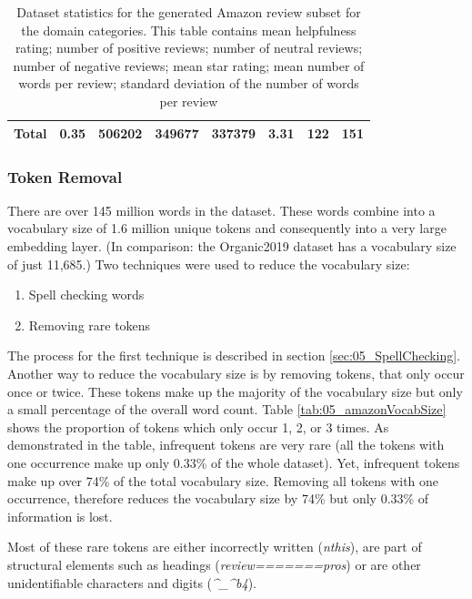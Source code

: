 \begin{table}
\begin{tabularx}{\textwidth}{lXrrrcrr}
		\midrule
		Total						&	0.35 & 	   506202 &	349677& 337379&    3.31 &	 122 &  151 \\
		\bottomrule
	\end{tabularx}
	\caption{Dataset statistics for the generated Amazon review subset for the domain categories. This table contains mean helpfulness rating; number of positive reviews; number of neutral reviews; number of negative reviews; mean star rating; mean number of words per review; standard deviation of the number of words per review }
		\label{tab:05_amazonDatasetStats}
\end{table}

\subsubsection*{Token Removal}
\label{sec:05_amazonTokens}
There are over 145 million words in the dataset. These words combine into a vocabulary size of 1.6 million unique tokens and consequently into a very large embedding layer. {(In comparison: the Organic2019 dataset has a vocabulary size of just 11,685.)} Two techniques were used to reduce the vocabulary size:

\begin{enumerate}
	\item Spell checking words
	\item Removing rare tokens
\end{enumerate}

The process for the first technique is described in section \ref{sec:05_SpellChecking}. Another way to reduce the vocabulary size is by removing tokens, that only occur once or twice. These tokens make up the majority of the vocabulary size but only a small percentage of the overall word count. Table \ref{tab:05_amazonVocabSize} shows the proportion of tokens which only occur 1, 2, or 3 times. As demonstrated in the table, infrequent tokens are very rare {(all the tokens with one occurrence make up only 0.33\% of the whole dataset)}. Yet, infrequent tokens make up over 74\% of the total vocabulary size. Removing all tokens with one occurrence, therefore reduces the vocabulary size by 74\% but only 0.33\% of information is lost.

Most of these rare tokens are either incorrectly written {(\textit{nthis})}, are part of structural elements such as headings {(\textit{review=======pros})} or are other unidentifiable characters and digits ({\textit{\^{}\_\^{}b4}}).

